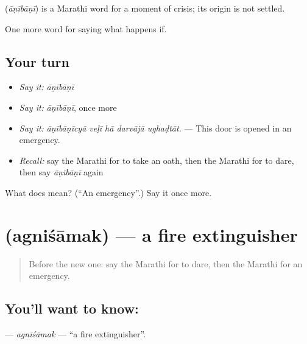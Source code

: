 \begin{cousinweb}
\textbf{} (\emph{āṇībāṇī}) is a Marathi word for a moment of crisis; its origin is not settled.
\end{cousinweb}

\begin{grammarlens}[title={What you've built}]
One more word for saying what happens if.
\end{grammarlens}

\subsection*{Your turn}
\begin{itemize}
\raggedright
  \item \emph{Say it:} \emph{āṇībāṇī}
  \item \emph{Say it:} \emph{āṇībāṇī}, once more
  \item \emph{Say it:} \emph{āṇībāṇīcyā veḷī hā darvājā ughaḍtāt.} — This door is opened in an emergency.
  \item \emph{Recall:} say the Marathi for to take an oath, then the Marathi for to dare, then say \emph{āṇībāṇī} again
\end{itemize}

\begin{tcolorbox}[breakable,colback=teal!4,colframe=teal!35!black,title={Before you move on}]
What does  mean? (\textquotedblleft{}An emergency\textquotedblright{}.) Say it once more.
\end{tcolorbox}
\section[\texorpdfstring{\mr{अग्निशामक} (agniśāmak)}{अग्निशामक (agniśāmak)}]{ (agniśāmak) — a fire extinguisher}

\label{lesson:MR-C547-agnisamak}



\begin{quote}
Before the new one: say the Marathi for to dare, then the Marathi for an emergency.
\end{quote}

\subsection*{You'll want to know: }
\textbf{} — \emph{agniśāmak} — \textquotedblleft{}a fire extinguisher\textquotedblright{}.

